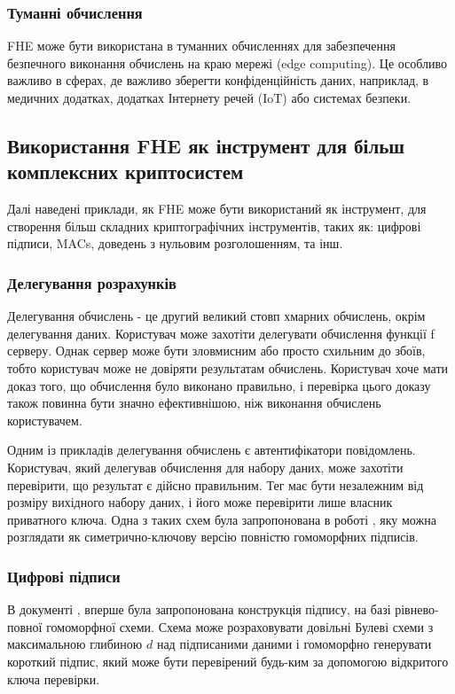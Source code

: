 \subsubsection*{Туманні обчислення}
FHE може бути використана в туманних обчисленнях для забезпечення безпечного виконання
обчислень на краю мережі (edge computing). Це особливо важливо в сферах, де важливо
зберегти конфіденційність даних, наприклад, в медичних додатках, додатках Інтернету речей
(IoT) або системах безпеки.

\subsection*{Використання FHE як інструмент для більш комплексних криптосистем}

Далі наведені приклади, як FHE може бути використаний як інструмент, для створення більш
складних криптографічних інструментів, таких як: цифрові  підписи, MACs, доведень з нульовим
розголошенням, та інш.

\subsubsection*{Делегування розрахунків}
Делегування обчислень - це другий великий стовп хмарних обчислень, окрім делегування даних.
Користувач може захотіти делегувати обчислення функції f серверу. Однак сервер може бути
зловмисним або просто схильним до збоїв, тобто користувач може не довіряти результатам
обчислень. Користувач хоче мати доказ того, що обчислення було виконано правильно, і перевірка
цього доказу також повинна бути значно ефективнішою, ніж виконання обчислень користувачем.


Одним із прикладів делегування обчислень є автентифікатори повідомлень. Користувач, який
делегував обчислення для набору даних, може захотіти перевірити, що
результат є дійсно правильним. Тег має бути незалежним від розміру вихідного набору даних, і
його може перевірити лише власник приватного ключа. Одна з таких схем була запропонована в
роботі \cite{10.1007/978-3-642-42045-0_16}, яку можна розглядати як симетрично-ключову версію
повністю гомоморфних підписів.

\subsubsection*{Цифрові підписи}
В документі \cite{cryptoeprint:2014/897}, вперше була запропонована конструкція підпису, 
на базі рівнево-повної гомоморфної схеми. Схема може розраховувати довільні Булеві схеми з
максимальною глибиною \(d\) над підписаними даними і гомоморфно генерувати короткий підпис,
який може бути перевірений будь-ким за допомогою відкритого ключа перевірки. 

